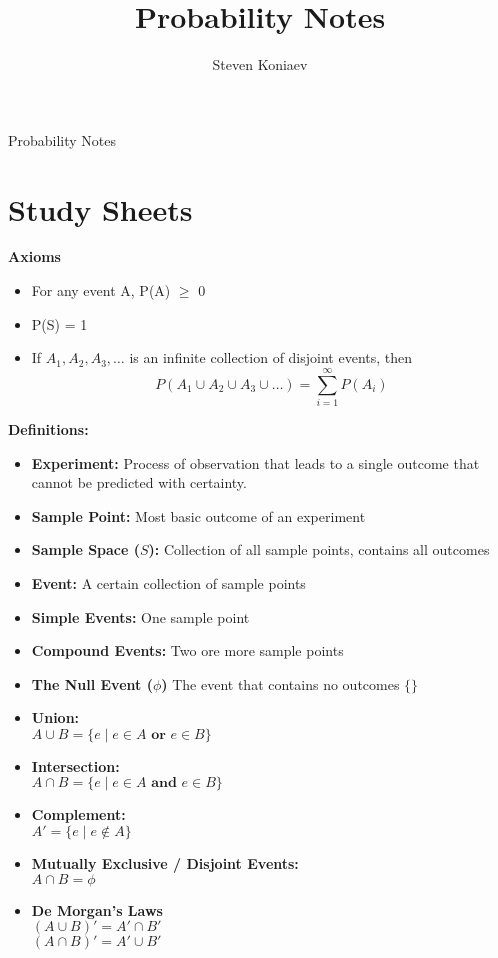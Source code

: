 \documentclass[12pt]{article}
\title{Probability Notes}
\author{Steven Koniaev}
\begin{document}
	\begin{center}
		Probability Notes
	\end{center}
	
	\section*{Study Sheets}
	
	\begin{flushleft}
		\textbf{Axioms}
		\begin{itemize}
			\item For any event A, P(A) $\geq$ 0
			\item P(S) = 1
			\item If $A_1, A_2, A_3, \ldots$ is an infinite collection of disjoint events, then 
			$$P(A_1 \cup A_2 \cup A_3 \cup \ldots) = \sum_{i=1}^{\infty} P(A_i)$$
		\end{itemize}
	\end{flushleft}
	
	
	\begin{flushleft}
		\textbf{Definitions:} \\
		\begin{itemize}
			\item \textbf{Experiment:} Process of observation that leads to a single outcome that cannot be predicted with certainty.
			\item \textbf{Sample Point:} Most basic outcome of an experiment
			\item \textbf{Sample Space ($S$):} Collection of all sample points, contains all outcomes
			\item \textbf{Event:} A certain collection of sample points
			\item \textbf{Simple Events:} One sample point
			\item \textbf{Compound Events:} Two ore more sample points
			\item \textbf{The Null Event ($\phi$)} The event that contains no outcomes  $\{\}$ \\	
			\item \textbf{Union:} \\ 
			$A \cup B = \{e \mid e \in A \textbf{ or } e \in B\}$
			\item \textbf{Intersection:} \\ 
			$A \cap B =  \{e \mid e \in A \textbf{ and } e \in B\}$
			\item \textbf{Complement:} \\ 
			$A' =  \{e \mid e \notin A\}$ \\
			\item \textbf{Mutually Exclusive / Disjoint Events:} \\
			$ A \cap B = \phi $
			\item \textbf{De Morgan's Laws} \\
			$  (A \cup B)' = A' \cap B' $ \\
			$ (A \cap B)' = A' \cup B'$
		\end{itemize}
	\end{flushleft}
\end{document}
